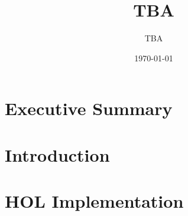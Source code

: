 \documentclass{book}
\title{TBA}
\author{TBA}
\date{\today}
\begin{document}
\lstset{language=ML}
\maketitle{}


\begin{acknowledgments}
\end{acknowledgments}

\tableofcontents{}

\chapter*{Executive Summary}
\label{cha:executive-summary}

\chapter*{Introduction}
\label{cha:introduction}


\chapter{HOL Implementation}
\label{cha:hol-implementation}

%
\end{document}
